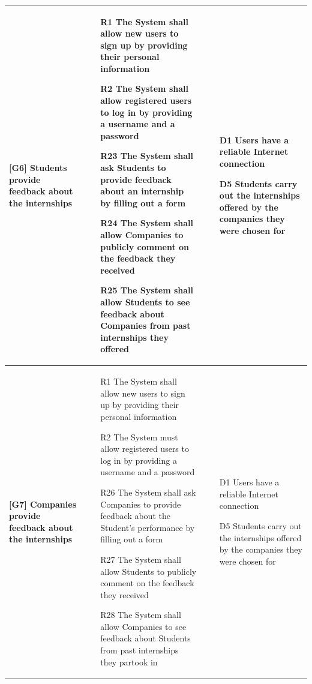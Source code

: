\begin{longtable}{|p{4cm}|p{5.5cm}|p{5.5cm}|}
    
        \textbf{[G6] \newline Students provide feedback about the internships} & 
    \begin{itemize}[label=$\bullet$]
        \item [R1] The System shall allow new users to sign up by providing their personal information
        \item [R2] The System shall allow registered users to log in by providing a username and a password
        \item [R23] The System shall ask Students to provide feedback about an internship by filling out a form
        \item [R24] The System shall allow Companies to publicly comment on the feedback they received
        \item [R25] The System shall allow Students to see feedback about Companies from past internships they offered
    \end{itemize}
    &
    \begin{itemize}[label=$\bullet$]
        \item [D1] Users have a reliable Internet connection
        \item [D5] Students carry out the internships offered by the companies they were chosen for
    \end{itemize} \\ 
    \hline
        \textbf{[G7] \newline Companies provide feedback about the internships} & 
    \begin{itemize}[label=$\bullet$]
        \item [R1] The System shall allow new users to sign up by providing their personal information
        \item [R2] The System must allow registered users to log in by providing a username and a password
        \item [R26] The System shall ask Companies to provide feedback about the Student’s performance by filling out a form
        \item [R27] The System shall allow Students to publicly comment on the feedback they received
        \item [R28] The System shall allow Companies to see feedback about Students from past internships they partook in

    \end{itemize}
    &
    \begin{itemize}[label=$\bullet$]
        \item [D1] Users have a reliable Internet connection
        \item [D5] Students carry out the internships offered by the companies they were chosen for
    \end{itemize} \\ 
    \hline
    
\end{longtable}
\newpage

